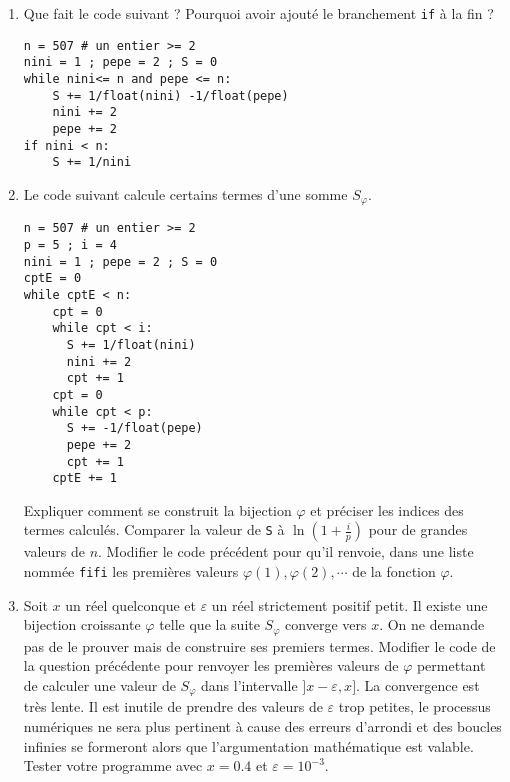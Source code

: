 \begin{enumerate}
  \item Que fait le code suivant ? Pourquoi avoir ajouté le branchement \texttt{if} à la fin ?
\begin{verbatim}
n = 507 # un entier >= 2
nini = 1 ; pepe = 2 ; S = 0
while nini<= n and pepe <= n:
    S += 1/float(nini) -1/float(pepe) 
    nini += 2
    pepe += 2
if nini < n:
    S += 1/nini
\end{verbatim}
  \item Le code suivant calcule certains termes d'une somme $S_{\varphi}$.
\begin{verbatim}
n = 507 # un entier >= 2
p = 5 ; i = 4
nini = 1 ; pepe = 2 ; S = 0
cptE = 0
while cptE < n:
    cpt = 0
    while cpt < i:
      S += 1/float(nini) 
      nini += 2
      cpt += 1
    cpt = 0
    while cpt < p:
      S += -1/float(pepe)
      pepe += 2
      cpt += 1
    cptE += 1
\end{verbatim}
Expliquer comment se construit la bijection $\varphi$ et préciser les indices des termes calculés. Comparer la valeur de \texttt{S} à $\ln(1+\frac{i}{p})$ pour de grandes valeurs de $n$.\newline
Modifier le code précédent pour qu'il renvoie, dans une liste nommée \texttt{fifi} les premières valeurs $\varphi(1),\varphi(2),\cdots$ de la fonction $\varphi$.

\item Soit $x$ un réel quelconque et $\varepsilon$ un réel strictement positif petit. Il existe une bijection croissante $\varphi$ telle que la suite $S_{\varphi}$ converge vers $x$.\newline
On ne demande pas de le prouver mais de construire ses premiers termes. Modifier le code de la question précédente pour renvoyer les premières valeurs de $\varphi$ permettant de calculer une valeur de $S_{\varphi}$ dans l'intervalle $]x-\varepsilon, x]$.\newline
La convergence est très lente. Il est inutile de prendre des valeurs de $\varepsilon$ trop petites, le processus numériques ne sera plus pertinent à cause des erreurs d'arrondi et des boucles infinies se formeront alors que l'argumentation mathématique est valable. Tester votre programme avec $x=0.4$ et $\varepsilon = 10^{-3}$.
\end{enumerate}
